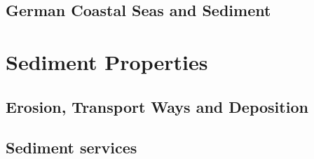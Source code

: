 \subsection{German Coastal Seas and Sediment}

\section{Sediment Properties}

\subsection{Erosion, Transport Ways and Deposition}

\subsection{Sediment services}

